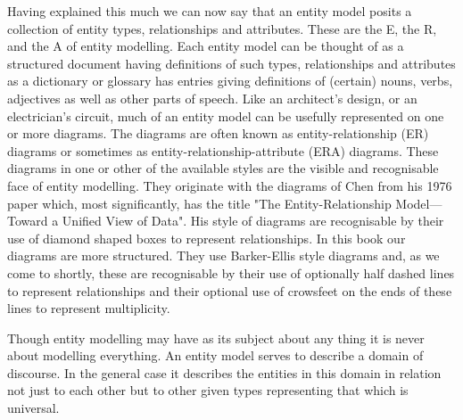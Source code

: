 \mynote Having explained this much we can now say that an entity model posits a collection of entity types, relationships and attributes. These are the E, the R, and the A of entity modelling.
Each entity model can be thought of as a structured document having definitions of such  types, relationships and attributes as a dictionary or glossary has entries giving definitions of (certain) nouns, verbs, adjectives as well as other parts of speech. Like an architect's design, or an electrician's circuit, much of an entity model can be usefully represented on one or more diagrams. The diagrams are often known as entity-relationship (ER) diagrams or sometimes as  entity-relationship-attribute (ERA) diagrams. 
These diagrams in one or other of the available styles are the visible and recognisable face of entity modelling. They originate with the diagrams of Chen from his 1976 paper which, most significantly, has the title 
"The Entity-Relationship Model---Toward a Unified View of Data". His style of diagrams are recognisable by their use of diamond shaped boxes to represent relationships. In this book our diagrams are more structured. They use Barker-Ellis style diagrams and, as we come to shortly, these are recognisable by their use of optionally half dashed lines to represent relationships and their optional use of crowsfeet on the ends of these lines to represent multiplicity. 

\mynote Though entity modelling may have as its subject about any thing it is never about modelling everything.
An entity model serves to describe a domain of discourse. In the general case it describes the entities in this domain in relation not just to each other but to other given types representing that which is universal. 


